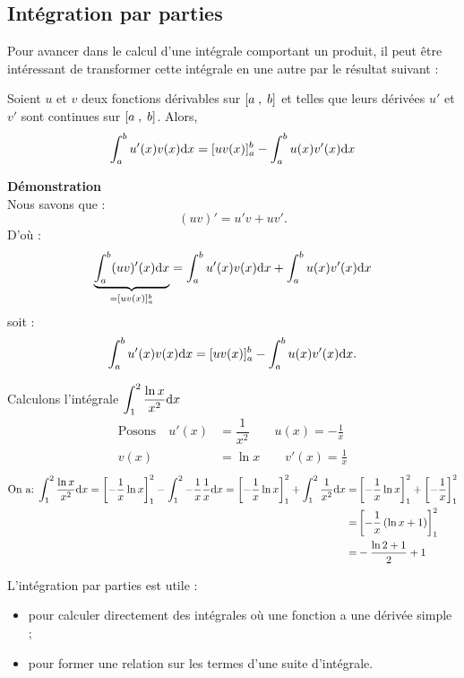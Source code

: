\subsection*{Intégration par parties}
Pour avancer dans le calcul d'une intégrale comportant un produit, il peut être intéressant de transformer cette intégrale en une autre par le résultat suivant :

\begin{theorem}
Soient $u$ et $v$ deux fonctions dérivables sur $\left[a\;,\; b\right]$ et telles que leurs dérivées  $u'$ et $v'$  sont continues sur  $\left[a\;,\; b\right]$.
Alors,
\[
\displaystyle\int_{a}^{b}u'(x)v(x){\rm d}x = [uv(x)]_a^b-\displaystyle\int_{a}^{b}u(x)v'(x){\rm d}x 
\]

\end{theorem} 

\textbf{Démonstration}\\
Nous savons que :
\[ (uv)'=u'v+uv'.\]
D'où :
\[ \underbrace{\displaystyle\int_{a}^{b}(uv)'(x){\rm d}x}_{=[uv(x)]_a^b} = \displaystyle\int_{a}^{b}u'(x)v(x){\rm d}x + \displaystyle\int_{a}^{b}u(x)v'(x){\rm d}x\]
soit :
\[ \displaystyle\int_{a}^{b}u'(x)v(x){\rm d}x = [uv(x)]_a^b-\displaystyle\int_{a}^{b}u(x)v'(x){\rm d}x.\]

\begin{example}

Calculons l'intégrale\; $ \displaystyle\int_{1}^{2}\dfrac{\ln x}{x^{2}}{\rm d}x $\\
\begin{align*}
\text{Posons} \quad  u'(x)&=\dfrac{1}{x^{2}} \qquad u(x)=-\frac{1}{x}\\
v(x)&=\ln x \qquad  v'(x)=\frac{1}{x}
\end{align*}
\begin{align*}
\text{On a:}\;   \displaystyle\int_{1}^{2}\dfrac{\ln x}{x^{2}}{\rm d}x = \left[ -\dfrac{1}{x}\ln x \right]^{2}_1 - \displaystyle\int_{1}^{2}-\dfrac{1}{x}\dfrac{1}{x}{\rm d}x=\left[ -\dfrac{1}{x}\ln x \right]^{2}_1 +\displaystyle\int_{1}^{2}\dfrac{1}{x^{2}}{\rm d}x=&\left[ -\dfrac{1}{x}\ln x \right]^{2}_1+\left[ -\dfrac{1}{x} \right]_{1}^{2}\\
=&\left[ -\dfrac{1}{x}\left(\ln x+1\right) \right]_{1}^{2}\\
=& -\dfrac{\ln 2+1}{2}+1
\end{align*}
\end{example}
\begin{remark}
L'intégration par parties est utile :
\begin{itemize}
\item pour calculer directement des intégrales où une fonction a une dérivée simple ;
\item pour former une relation sur les termes d'une suite d'intégrale.
\end{itemize}
\end{remark}
 

